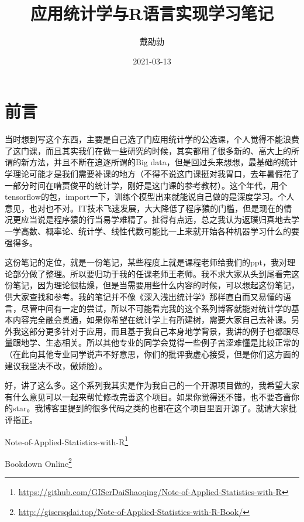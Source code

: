 \documentclass[]{ctexbook}
\title{应用统计学与R语言实现学习笔记}
\author{戴劭勍}
\date{2021-03-13}
\renewcommand{\href}[2]{#2\footnote{\url{#1}}}
\begin{document}
\maketitle


\thispagestyle{empty}



\setlength{\abovedisplayskip}{-5pt}
\setlength{\abovedisplayshortskip}{-5pt}

{
\setcounter{tocdepth}{2}
\tableofcontents
}
\hypertarget{ux524dux8a00}{%
\chapter*{前言}\label{ux524dux8a00}}


当时想到写这个东西，主要是自己选了门应用统计学的公选课，个人觉得不能浪费了这门课，而且其实我们在做一些研究的时候，其实都用了很多新的、高大上的所谓的新方法，并且不断在追逐所谓的Big data，但是回过头来想想，最基础的统计学理论可能才是我们需要补课的地方（不得不说这门课挺对我胃口，去年暑假花了一部分时间在啃贾俊平的统计学，刚好是这门课的参考教材）。这个年代，用个tensorflow的包，import一下，训练个模型出来就能说自己做的是深度学习。个人意见，也对也不对。IT技术飞速发展，大大降低了程序猿的门槛，但是现在的情况更应当说是程序猿的行当易学难精了。扯得有点远，总之我认为返璞归真地去学一学高数、概率论、统计学、线性代数可能比一上来就开始各种机器学习什么的要强得多。

这份笔记的定位，就是一份笔记，某些程度上就是课程老师给我们的ppt，我对理论部分做了整理。所以要归功于我的任课老师王老师。我不求大家从头到尾看完这份笔记，因为理论很枯燥，但是当需要用些什么内容的时候，可以想起这份笔记，供大家查找和参考。我的笔记并不像《深入浅出统计学》那样直白而又易懂的语言，尽管中间有一定的尝试，所以不可能看完我的这个系列博客就能对统计学的基本内容完全融会贯通，如果你希望在统计学上有所建树，需要大家自己去补课。另外我这部分更多针对于应用，而且基于我自己本身地学背景，我讲的例子也都跟尽量跟地学、生态相关。所以其他专业的同学会觉得一些例子苦涩难懂是比较正常的（在此向其他专业同学说声不好意思，你们的批评我虚心接受，但是你们这方面的建议我坚决不改，傲娇脸）。

好，讲了这么多。这个系列我其实是作为我自己的一个开源项目做的，我希望大家有什么意见可以一起来帮忙修改完善这个项目。如果你觉得还不错，也不要吝啬你的star。我博客里提到的很多代码之类的也都在这个项目里面开源了。就请大家批评指正。

\href{https://github.com/GISerDaiShaoqing/Note-of-Applied-Statistics-with-R}{Note-of-Applied-Statistics-with-R}

\href{http://gisersqdai.top/Note-of-Applied-Statistics-with-R-Book/}{Bookdown Online}
\end{document}
